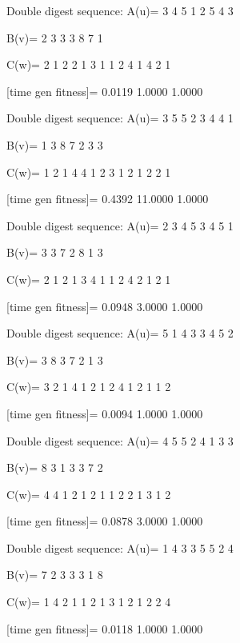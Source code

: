 Double digest sequence:
A(u)=
     3     4     5     1     2     5     4     3

B(v)=
     2     3     3     3     8     7     1

C(w)=
     2     1     2     2     1     3     1     1     2     4     1     4     2     1

[time gen fitness]=
    0.0119    1.0000    1.0000

Double digest sequence:
A(u)=
     3     5     5     2     3     4     4     1

B(v)=
     1     3     8     7     2     3     3

C(w)=
     1     2     1     4     4     1     2     3     1     2     1     2     2     1

[time gen fitness]=
    0.4392   11.0000    1.0000

Double digest sequence:
A(u)=
     2     3     4     5     3     4     5     1

B(v)=
     3     3     7     2     8     1     3

C(w)=
     2     1     2     1     3     4     1     1     2     4     2     1     2     1

[time gen fitness]=
    0.0948    3.0000    1.0000

Double digest sequence:
A(u)=
     5     1     4     3     3     4     5     2

B(v)=
     3     8     3     7     2     1     3

C(w)=
     3     2     1     4     1     2     1     2     4     1     2     1     1     2

[time gen fitness]=
    0.0094    1.0000    1.0000

Double digest sequence:
A(u)=
     4     5     5     2     4     1     3     3

B(v)=
     8     3     1     3     3     7     2

C(w)=
     4     4     1     2     1     2     1     1     2     2     1     3     1     2

[time gen fitness]=
    0.0878    3.0000    1.0000

Double digest sequence:
A(u)=
     1     4     3     3     5     5     2     4

B(v)=
     7     2     3     3     3     1     8

C(w)=
     1     4     2     1     1     2     1     3     1     2     1     2     2     4

[time gen fitness]=
    0.0118    1.0000    1.0000

